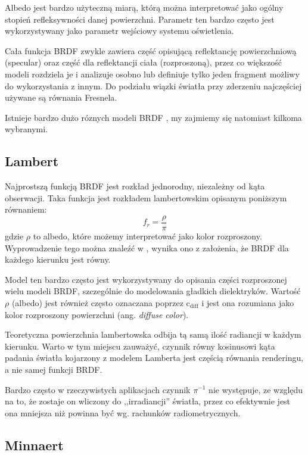 \documentclass[../main.tex]{subfiles}
\begin{document}
Albedo jest bardzo użyteczną miarą, którą można interpretować jako ogólny stopień refleksywności danej powierzchni. Parametr ten bardzo często jest wykorzystywany jako parametr wejściowy systemu oświetlenia.

Cała funkcja BRDF zwykle zawiera część opisującą reflektancję powierzchniową (specular) oraz część dla reflektancji ciała (rozproszoną), przez co większość modeli rozdziela je i analizuje osobno lub definiuje tylko jeden fragment możliwy do wykorzystania z innym. Do podziału wiązki światła przy zderzeniu najczęściej używane są równania Fresnela.

Istnieje bardzo dużo róznych modeli BRDF \cite{brdf_overview}, my zajmiemy się natomiast kilkoma wybranymi.

\subsection{Lambert}

Najprostszą funkcją BRDF jest rozkład jednorodny, niezależny od kąta obserwacji. Taka funkcja jest rozkładem lambertowskim opisanym poniższym równaniem:
\[
  f_r = \frac{\rho}{\pi}
\]
\noindent gdzie $\rho$ to albedo, które możemy interpretować jako kolor rozproszony. Wyprowadzenie tego można znaleźć w \cite{RealTimeRendering2008}\cite{pbr_games_siggraph}, wynika ono z założenia, że BRDF dla każdego kierunku jest równy.

Model ten bardzo często jest wykorzystywany do opisania części rozproszonej wielu modeli BRDF, szczególnie do modelowania gładkich dielektryków. Wartość $\rho$ (albedo) jest również często oznaczana poprzez $\text{c}_{\text{diff}}$ i jest ona rozumiana jako kolor rozproszony powierzchni (ang. \textit{diffuse color}).

Teoretyczna powierzchnia lambertowska odbija tą samą ilość radiancji w każdym kierunku. Warto w tym miejscu zauważyć, czynnik równy kosinusowi kąta padania światła kojarzony z modelem Lamberta jest częścią równania renderingu, a nie samej funkcji BRDF.

Bardzo często w rzeczywistych aplikacjach czynnik $\pi^{-1}$ nie występuje, ze względu na to, że zostaje on wliczony do ,,irradiancji'' światła, przez co efektywnie jest ona mniejsza niż powinna być wg. rachunków radiometrycznych. 

\subsection{Minnaert}
\end{document}
